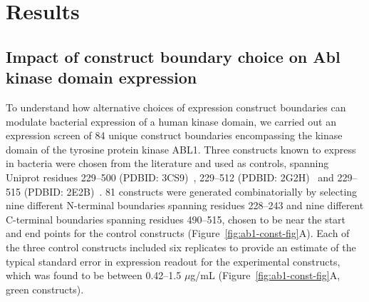 \documentclass[9pt,lineno]{elife}
\begin{document}
\section{Results}

\subsection{Impact of construct boundary choice on Abl kinase domain expression} 

To understand how alternative choices of expression construct boundaries can modulate bacterial expression of a human kinase domain, we carried out an expression screen of 84 unique construct boundaries encompassing the kinase domain of the tyrosine protein kinase ABL1. 
Three constructs known to express in bacteria were chosen from the literature and used as controls, spanning Uniprot residues 229--500 (PDBID: 3CS9)~\citep{Weisberg:2005boa}, 229--512 (PDBID: 2G2H)~\citep{levinson:plos-biology:2006:inactive-abl} and 229--515 (PDBID: 2E2B)~\citep{Horio:2007wo}. 
81 constructs were generated combinatorially by selecting nine different N-terminal boundaries spanning residues 228--243 and nine different C-terminal boundaries spanning residues 490--515, chosen to be near the start and end points for the control constructs (Figure~\ref{fig:ab1-const-fig}A). 
Each of the three control constructs included six replicates to provide an estimate of the typical standard error in expression readout for the experimental constructs, which was found to be between 0.42--1.5 $\mu$g/mL (Figure~\ref{fig:ab1-const-fig}A, green constructs). 
\end{document}
